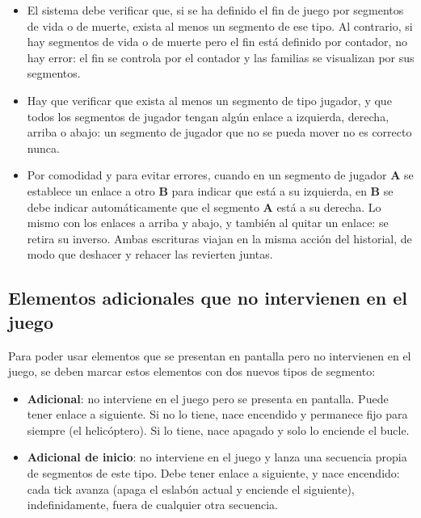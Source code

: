 \begin{itemize}
	\item El sistema debe verificar que, si se ha definido el fin de juego por segmentos de vida o de muerte, exista al menos un segmento de ese tipo. Al contrario, si hay segmentos de vida o de muerte pero el fin está definido por contador, no hay error: el fin se controla por el contador y las familias se visualizan por sus segmentos.
	
	\item Hay que verificar que exista al menos un segmento de tipo jugador, y que todos los segmentos de jugador tengan algún enlace a izquierda, derecha, arriba o abajo: un segmento de jugador que no se pueda mover no es correcto nunca.
	
	\item Por comodidad y para evitar errores, cuando en un segmento de jugador \textbf{A} se establece un enlace a otro \textbf{B} para indicar que está a su izquierda, en \textbf{B} se debe indicar automáticamente que el segmento \textbf{A} está a su derecha. Lo mismo con los enlaces a arriba y abajo, y también al quitar un enlace: se retira su inverso. Ambas escrituras viajan en la misma acción del historial, de modo que deshacer y rehacer las revierten juntas.
\end{itemize}

\subsection{Elementos adicionales que no intervienen en el juego}

Para poder usar elementos que se presentan en pantalla pero no intervienen en el juego, se deben marcar estos elementos con dos nuevos tipos de segmento:

\begin{itemize}
	\item \textbf{Adicional}: no interviene en el juego pero se presenta en pantalla. Puede tener enlace a siguiente. Si no lo tiene, nace encendido y permanece fijo para siempre (el helicóptero). Si lo tiene, nace apagado y solo lo enciende el bucle.
	
	\item \textbf{Adicional de inicio}: no interviene en el juego y lanza una secuencia propia de segmentos de este tipo. Debe tener enlace a siguiente, y nace encendido: cada tick avanza (apaga el eslabón actual y enciende el siguiente), indefinidamente, fuera de cualquier otra secuencia.
\end{itemize}

